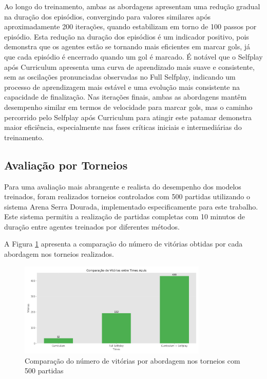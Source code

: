 Ao longo do treinamento, ambas as abordagens apresentam uma redução gradual na duração dos episódios, convergindo para valores similares após aproximadamente 200 iterações, quando estabilizam em torno de 100 passos por episódio. Esta redução na duração dos episódios é um indicador positivo, pois demonstra que os agentes estão se tornando mais eficientes em marcar gols, já que cada episódio é encerrado quando um gol é marcado. É notável que o Selfplay após Curriculum apresenta uma curva de aprendizado mais suave e consistente, sem as oscilações pronunciadas observadas no Full Selfplay, indicando um processo de aprendizagem mais estável e uma evolução mais consistente na capacidade de finalização. Nas iterações finais, ambas as abordagens mantêm desempenho similar em termos de velocidade para marcar gols, mas o caminho percorrido pelo Selfplay após Curriculum para atingir este patamar demonstra maior eficiência, especialmente nas fases críticas iniciais e intermediárias do treinamento.

\subsection{Avaliação por Torneios}

Para uma avaliação mais abrangente e realista do desempenho dos modelos treinados, foram realizados torneios controlados com 500 partidas utilizando o sistema Arena Serra Dourada, implementado especificamente para este trabalho. Este sistema permitiu a realização de partidas completas com 10 minutos de duração entre agentes treinados por diferentes métodos.

A Figura \ref{fig:comparacao_vitorias} apresenta a comparação do número de vitórias obtidas por cada abordagem nos torneios realizados.

\begin{figure}[H]
    \centering
    \includegraphics[width=0.8\textwidth]{fig/graficos_trabalho/graficos_torneios/geral/comparacao_vitorias.png}
    \caption{Comparação do número de vitórias por abordagem nos torneios com 500 partidas}
    \label{fig:comparacao_vitorias}
\end{figure}

